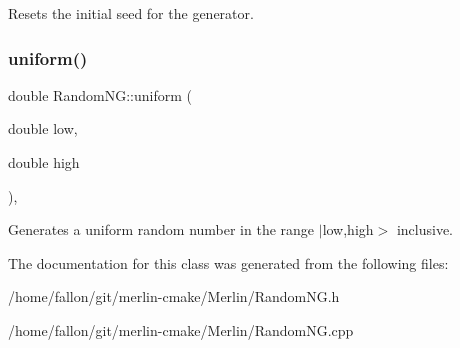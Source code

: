 Resets the initial seed for the generator. \mbox{\label{classRandomNG_a1590a28c391a32b94911ab14648a6a31}} 
\subsubsection{\texorpdfstring{uniform()}{uniform()}}
{\footnotesize\ttfamily double Random\+N\+G\+::uniform (\begin{DoxyParamCaption}\item[{double}]{low,  }\item[{double}]{high }\end{DoxyParamCaption})\hspace{0.3cm}{\ttfamily [inline]}, {\ttfamily [static]}}

Generates a uniform random number in the range $\vert$low,high$>$ inclusive. 

The documentation for this class was generated from the following files\+:\begin{DoxyCompactItemize}
\item 
/home/fallon/git/merlin-\/cmake/\+Merlin/Random\+N\+G.\+h\item 
/home/fallon/git/merlin-\/cmake/\+Merlin/Random\+N\+G.\+cpp\end{DoxyCompactItemize}
